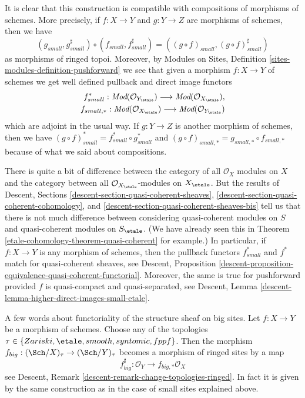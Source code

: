\medskip\noindent
It is clear that this construction is compatible with compositions of
morphisms of schemes. More precisely, if $f : X \to Y$ and $g : Y \to Z$
are morphisms of schemes, then we have
$$
(g_{small}, g_{small}^\sharp)
\circ
(f_{small}, f_{small}^\sharp)
=
((g \circ f)_{small}, (g \circ f)_{small}^\sharp)
$$
as morphisms of ringed topoi. Moreover, by
Modules on Sites, Definition \ref{sites-modules-definition-pushforward}
we see that given a morphism $f : X \to Y$ of schemes
we get well defined pullback and direct image functors
\begin{align*}
f_{small}^* :
\textit{Mod}(\mathcal{O}_{Y_\etale})
\longrightarrow
\textit{Mod}(\mathcal{O}_{X_\etale}), \\
f_{small, *} :
\textit{Mod}(\mathcal{O}_{X_\etale})
\longrightarrow
\textit{Mod}(\mathcal{O}_{Y_\etale})
\end{align*}
which are adjoint in the usual way. If $g : Y \to Z$ is another morphism
of schemes, then we have
$(g \circ f)_{small}^* = f_{small}^* \circ g_{small}^*$
and $(g \circ f)_{small, *} = g_{small, *} \circ f_{small, *}$
because of what we said about compositions.

\medskip\noindent
There is quite a bit of difference between the category
of all $\mathcal{O}_X$ modules on $X$ and the category between all
$\mathcal{O}_{X_\etale}$-modules on $X_\etale$. But the
results of
Descent, Sections \ref{descent-section-quasi-coherent-sheaves},
\ref{descent-section-quasi-coherent-cohomology}, and
\ref{descent-section-quasi-coherent-sheaves-bis}
tell us that there is not much difference between considering quasi-coherent
modules on $S$ and quasi-coherent modules on $S_\etale$.
(We have already seen this in
Theorem \ref{etale-cohomology-theorem-quasi-coherent}
for example.)
In particular, if $f : X \to Y$ is any morphism of schemes, then
the pullback functors $f_{small}^*$ and $f^*$ match for
quasi-coherent sheaves, see
Descent,
Proposition \ref{descent-proposition-equivalence-quasi-coherent-functorial}.
Moreover, the same is true for pushforward provided $f$ is
quasi-compact and quasi-separated, see
Descent, Lemma \ref{descent-lemma-higher-direct-images-small-etale}.

\medskip\noindent
A few words about functoriality of the structure sheaf on big sites.
Let $f : X \to Y$ be a morphism of schemes. Choose any of the
topologies $\tau \in \{Zariski,\linebreak[0]
\etale,\linebreak[0] smooth,\linebreak[0] syntomic,\linebreak[0]
fppf\}$. Then the morphism
$f_{big} : (\Sch/X)_\tau \to (\Sch/Y)_\tau$
becomes a morphism of ringed sites by a map
$$
f_{big}^\sharp : \mathcal{O}_Y \longrightarrow f_{big, *}\mathcal{O}_X
$$
see Descent, Remark \ref{descent-remark-change-topologies-ringed}.
In fact it is given by the same construction as in the case of small
sites explained above.

